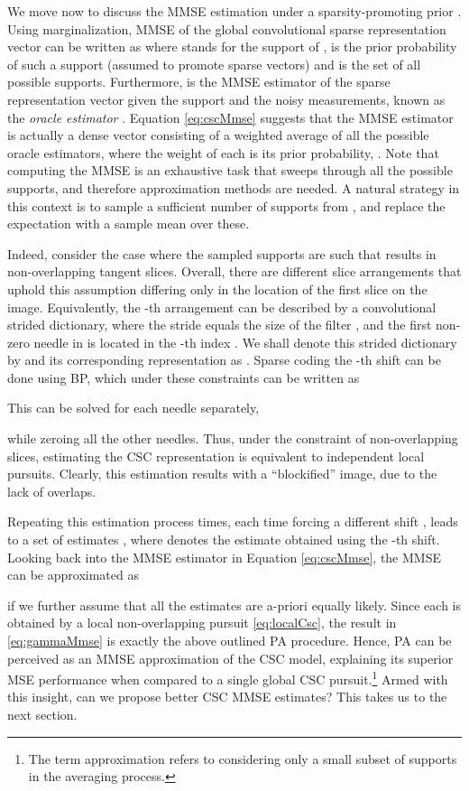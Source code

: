 \documentclass{article}
\begin{document}
We move now to discuss the MMSE estimation under a sparsity-promoting prior \cite{eladweighted,simon2018mmse}. Using marginalization, MMSE of the global convolutional sparse representation vector can be written as 
where  stands for the support of ,  is the prior probability of such a support (assumed to promote sparse vectors) and  is the set of all possible supports. Furthermore,  is the MMSE estimator of the sparse representation vector given the support and the noisy measurements, known as the \emph{oracle estimator} \cite{eladweighted}. Equation \eqref{eq:cscMmse} suggests that the MMSE estimator is actually a dense vector consisting of a weighted average of all the possible oracle estimators, where the weight of each is its prior probability, .  Note that computing the MMSE is an exhaustive task that sweeps through all the possible supports, and therefore approximation methods are needed. A natural strategy in this context is to sample a sufficient number of supports from , and replace the expectation with a sample mean over these. 

Indeed, consider the case where the sampled supports are such that  results in non-overlapping tangent slices. Overall, there are  different slice arrangements that uphold this assumption differing only in the location of the first slice on the image. Equivalently, the -th arrangement can be described by a convolutional strided dictionary, where the stride equals the size of the filter , and the first non-zero needle in  is located in the -th index . We shall denote this strided dictionary by  and its corresponding representation as . Sparse coding the -th shift can be done using BP, which under these constraints can be written as

This can be solved for each needle separately,

while zeroing all the other needles.
Thus, under the constraint of non-overlapping slices, estimating the CSC representation  is equivalent to  independent local pursuits. Clearly, this estimation results with a ``blockified'' image, due to the lack of overlaps.

Repeating this estimation process  times, each time forcing a different shift , leads to a set of estimates , where  denotes the estimate obtained using the -th shift. Looking back into the MMSE estimator in Equation \eqref{eq:cscMmse}, the MMSE can be approximated as 

if we further assume that all the estimates are a-priori equally likely.
Since each  is obtained by a local non-overlapping pursuit \eqref{eq:localCsc}, the result in \eqref{eq:gammaMmse} is exactly the above outlined PA procedure. Hence, PA can be perceived as an MMSE approximation of the CSC model, explaining its superior MSE performance when compared to a single global CSC pursuit.\footnote{The term approximation refers to considering only a small subset of supports in the averaging process.} Armed with this insight, can we propose better CSC MMSE estimates? This takes us to the next section. 
\end{document}
